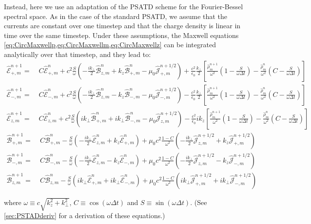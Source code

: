 \documentclass[1p,times,authoryear]{elsarticle}
\newcommand{\tB}[2]{\spectral{B}_{#1,m}^{#2}}
\newcommand{\tE}[2]{\spectral{E}_{#1,m}^{#2}}
\newcommand{\tj}[2]{\spectral{J}_{#1,m}^{#2}}
\newcommand{\trho}[1]{\spectral{\rho}_{m}^{#1}}
\newcommand{\spectral}[1]{\hat{\mathcal{#1}}}
\begin{document}
Instead, here we use an adaptation of the PSATD scheme \citep{Haber} for the
Fourier-Bessel spectral space. As in the case of the standard
PSATD, we assume that the currents are constant over one timestep and
that the charge density is linear in time over the same timestep. Under these
assumptions, the Maxwell equations \cref{eq:CircMaxwellp,eq:CircMaxwellm,eq:CircMaxwellz} can be integrated
analytically over that timestep, and they lead to:
\begin{align*}
\tE{+}{n+1} = \; & C \tE{+}{n} + 
c^2\frac{S}{\omega}\left(-\frac{ik_\perp }{2} \tB{z}{n} + k_z\tB{+}{n}
- \mu_0 \tj{+}{n+1/2} \right) + \frac{c^2}{\epsilon_0}
\frac{k_\perp}{2}\left[ \frac{\trho{n+1}}{\omega^2}\left(
  1 - \frac{S}{\omega\Delta t}\right) -
\frac{\trho{n}}{\omega^2}\left( C -\frac{S}{\omega\Delta t}\right)\right]  & \\
\tE{-}{n+1} =\; & C \tE{-}{n} +
c^2\frac{S}{\omega}\left(- \frac{ik_\perp }{2} \tB{z}{n} - k_z\tB{-}{n}
- \mu_0 \tj{-}{n+1/2} \right) - \frac{c^2}{\epsilon_0}
\frac{k_\perp}{2}\left[ \frac{\trho{n+1}}{\omega^2}\left(
  1 - \frac{S}{\omega\Delta t}\right) - \frac{\trho{n}}{\omega^2}
\left( C - \frac{S}{\omega\Delta t}\right)\right]  &\\
\tE{z}{n+1} =\; & C \tE{z}{n} + 
c^2\frac{S}{\omega}\left(ik_\perp \tB{+}{n} + ik_\perp \tB{-}{n}
- \mu_0 \tj{z}{n+1/2} \right) - \frac{c^2}{\epsilon_0}
ik_z\left[ \frac{\trho{n+1}}{\omega^2}\left(
  1 - \frac{S}{\omega\Delta t}\right) - \frac{\trho{n}}{\omega^2}
\left( C - \frac{S}{\omega\Delta t}\right)\right]  &
\end{align*}
\begin{align*}
\tB{+}{n+1} = \; & C \tB{+}{n} - 
\frac{S}{\omega}\left(-\frac{ik_\perp }{2} \tE{z}{n} + k_z\tE{+}{n}
\right) + \mu_0 c^2\frac{1-C}{\omega^2} \left( -\frac{ik_\perp }{2}
  \tj{z}{n+1/2} + k_z \tj{+}{n+1/2} \right)& \\
\tB{-}{n+1} =\; & C \tB{-}{n} - 
\frac{S}{\omega}\left(- \frac{ik_\perp }{2} \tE{z}{n} - k_z\tE{-}{n}
\right) + \mu_0 c^2\frac{1-C}{\omega^2} \left( - \frac{ik_\perp }{2}
  \tj{z}{n+1/2} - k_z \tj{-}{n+1/2} \right) &\\
\tB{z}{n+1} =\; & C \tB{z}{n} - 
\frac{S}{\omega}\left(ik_\perp \tE{+}{n} + ik_\perp \tE{-}{n}
\right) + \mu_0 c^2\frac{1-C}{\omega^2} \left( ik_\perp
  \tj{+}{n+1/2} + ik_\perp \tj{-}{n+1/2} \right)&
\end{align*}

\noindent where $\omega \equiv c\sqrt{k_z^2 + k_\perp^2}$, $C \equiv \cos(\omega \Delta t)$
and $S \equiv \sin(\omega \Delta t) $. (See \ref{sec:PSTADderiv} for a
derivation of these equations.)
\end{document}
